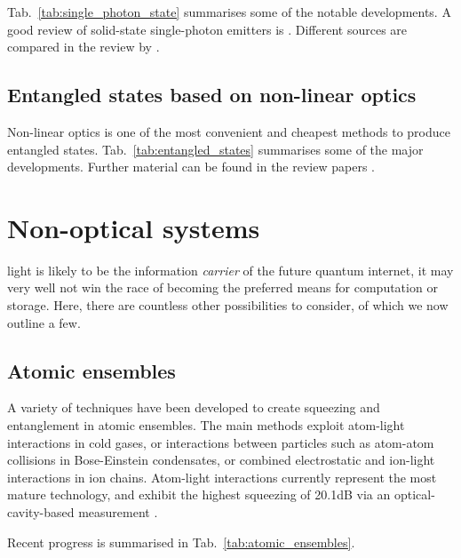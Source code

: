 Tab.~\ref{tab:single_photon_state} summarises some of the notable developments. A good review of solid-state single-photon emitters is \cite{bib:aharonovich2016solid}. Different sources are compared in the review by \cite{bib:eisaman2011}.

%
%

\subsection{Entangled states based on non-linear optics} 

Non-linear optics is one of the most convenient and cheapest methods to produce entangled states. Tab.~\ref{tab:entangled_states} summarises some of the major developments. Further material can be found in the review papers \cite{bib:pan2012multiphoton, bib:ralph2009bright}.

%
%

\section{Non-optical systems}

 light is likely to be the information \textit{carrier} of the future quantum internet, it may very well not win the race of becoming the preferred means for computation or storage. Here, there are countless other possibilities to consider, of which we now outline a few.

%
%

\subsection{Atomic ensembles} 

A variety of techniques have been developed to create squeezing and entanglement in atomic ensembles. The main methods exploit atom-light interactions in cold gases, or interactions between particles such as atom-atom collisions in Bose-Einstein condensates, or combined electrostatic and ion-light interactions in ion chains. Atom-light interactions currently represent the most mature technology, and exhibit the highest squeezing of 20.1dB via an optical-cavity-based measurement \cite{bib:hosten2016measurement}.

Recent progress is summarised in Tab.~\ref{tab:atomic_ensembles}.

